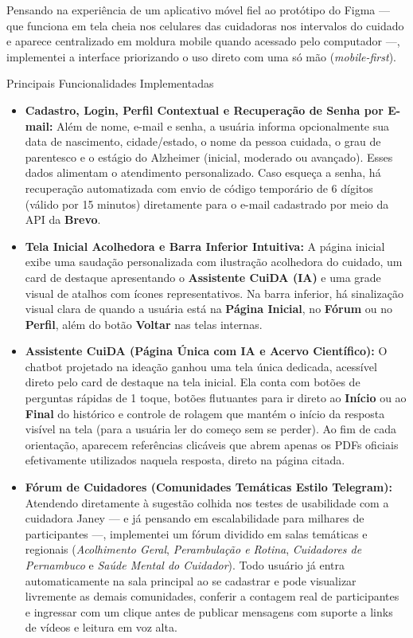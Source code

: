 \documentclass[11pt,a4paper]{article}
\newcommand{\subtituloSecao}[1]{%
  \par\addvspace{10pt}%
  {\noindent\fontsize{16pt}{20pt}\selectfont\normalfont\color{headingBlue}#1\par}%
  \vspace{3pt}%
}
\begin{document}
Pensando na experiência de um aplicativo móvel fiel ao protótipo do Figma — que funciona em tela cheia nos celulares das cuidadoras nos intervalos do cuidado e aparece centralizado em moldura mobile quando acessado pelo computador —, implementei a interface priorizando o uso direto com uma só mão (\textit{mobile-first}).

\subtituloSecao{Principais Funcionalidades Implementadas}

\begin{itemize}[leftmargin=1.25cm, label=\textbullet, topsep=2pt, itemsep=6pt]
  \item \textbf{Cadastro, Login, Perfil Contextual e Recuperação de Senha por E-mail:} Além de nome, e-mail e senha, a usuária informa opcionalmente sua data de nascimento, cidade/estado, o nome da pessoa cuidada, o grau de parentesco e o estágio do Alzheimer (inicial, moderado ou avançado). Esses dados alimentam o atendimento personalizado. Caso esqueça a senha, há recuperação automatizada com envio de código temporário de 6 dígitos (válido por 15 minutos) diretamente para o e-mail cadastrado por meio da API da \textbf{Brevo}.
  \item \textbf{Tela Inicial Acolhedora e Barra Inferior Intuitiva:} A página inicial exibe uma saudação personalizada com ilustração acolhedora do cuidado, um card de destaque apresentando o \textbf{Assistente CuiDA (IA)} e uma grade visual de atalhos com ícones representativos. Na barra inferior, há sinalização visual clara de quando a usuária está na \textbf{Página Inicial}, no \textbf{Fórum} ou no \textbf{Perfil}, além do botão \textbf{Voltar} nas telas internas.
  \item \textbf{Assistente CuiDA (Página Única com IA e Acervo Científico):} O chatbot projetado na ideação ganhou uma tela única dedicada, acessível direto pelo card de destaque na tela inicial. Ela conta com botões de perguntas rápidas de 1 toque, botões flutuantes para ir direto ao \textbf{Início} ou ao \textbf{Final} do histórico e controle de rolagem que mantém o início da resposta visível na tela (para a usuária ler do começo sem se perder). Ao fim de cada orientação, aparecem referências clicáveis que abrem apenas os PDFs oficiais efetivamente utilizados naquela resposta, direto na página citada.
  \item \textbf{Fórum de Cuidadores (Comunidades Temáticas Estilo Telegram):} Atendendo diretamente à sugestão colhida nos testes de usabilidade com a cuidadora Janey — e já pensando em escalabilidade para milhares de participantes —, implementei um fórum dividido em salas temáticas e regionais (\textit{Acolhimento Geral}, \textit{Perambulação e Rotina}, \textit{Cuidadores de Pernambuco} e \textit{Saúde Mental do Cuidador}). Todo usuário já entra automaticamente na sala principal ao se cadastrar e pode visualizar livremente as demais comunidades, conferir a contagem real de participantes e ingressar com um clique antes de publicar mensagens com suporte a links de vídeos e leitura em voz alta.

\end{itemize}
\end{document}
